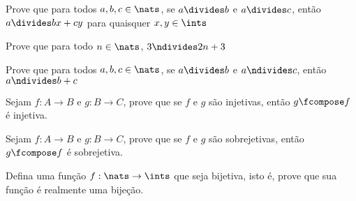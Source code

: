 \begin{exercise}
%
Prove que para todos $a, b, c \in \nats$, se $a \divides b$ e $a \divides c$, então $a \divides bx + cy$ para quaisquer $x, y \in \ints$
\end{exercise}

\begin{exercise}
%
Prove que para todo $n \in\nats$, $3 \ndivides 2n + 3$
\end{exercise}

\begin{exercise}
%
Prove que para todos $a, b, c \in\nats$, se $a \divides b$ e $a \ndivides c$, então $a \ndivides b + c$
\end{exercise}

\begin{exercise}
%
Sejam $f : A \to B$ e $g : B \to C$, prove que se $f$ e $g$ são injetivas, então $g \fcompose f$ é injetiva.
\end{exercise}

\begin{exercise}
%
Sejam $f : A \to B$ e $g : B \to C$, prove que se $f$ e $g$ são sobrejetivas, então $g \fcompose f$ é sobrejetiva.
\end{exercise}

\begin{exercise}
%
Defina uma função $f : \nats\to\ints$ que seja bijetiva, isto é, prove que sua função é realmente uma bijeção.
\end{exercise}

